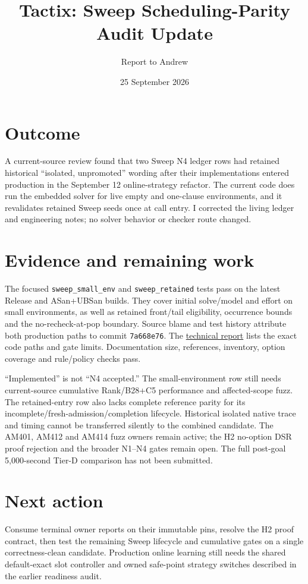 \documentclass[11pt]{article}
\title{Tactix: Sweep Scheduling-Parity Audit Update}
\author{Report to Andrew}
\date{25 September 2026}
\begin{document}
\maketitle
\vspace{-1.5em}

\section*{Outcome}
A current-source review found that two Sweep N4 ledger rows had retained
historical ``isolated, unpromoted'' wording after their implementations entered
production in the September 12 online-strategy refactor. The current code
does run the embedded solver for live empty and one-clause environments, and
it revalidates retained Sweep seeds once at call entry. I corrected the living
ledger and engineering notes; no solver behavior or checker route changed.

\section*{Evidence and remaining work}
The focused \texttt{sweep\_small\_env} and \texttt{sweep\_retained} tests pass
on the latest Release and ASan+UBSan builds. They cover initial solve/model
and effort on small environments, as well as retained front/tail eligibility,
occurrence bounds and the no-recheck-at-pop boundary. Source blame and test
history attribute both production paths to commit \texttt{7a668e76}. The
\href{../../benchmarks/reports/2026-09-25-am424-sweep-n4-ledger-current-source.md}{technical report}
lists the exact code paths and gate limits. Documentation size, references,
inventory, option coverage and rule/policy checks pass.

``Implemented'' is not ``N4 accepted.'' The small-environment row still needs
current-source cumulative Rank/B28+C5 performance and affected-scope fuzz.
The retained-entry row also lacks complete reference parity for its
incomplete/fresh-admission/completion lifecycle. Historical isolated native
trace and timing cannot be transferred silently to the combined candidate.
The AM401, AM412 and AM414 fuzz owners remain active; the H2 no-option DSR
proof rejection and the broader N1--N4 gates remain open. The full post-goal
5,000-second Tier-D comparison has not been submitted.

\section*{Next action}
Consume terminal owner reports on their immutable pins, resolve the H2 proof
contract, then test the remaining Sweep lifecycle and cumulative gates on a
single correctness-clean candidate. Production online learning still needs
the shared default-exact slot controller and owned safe-point strategy
switches described in the earlier readiness audit.
\end{document}
